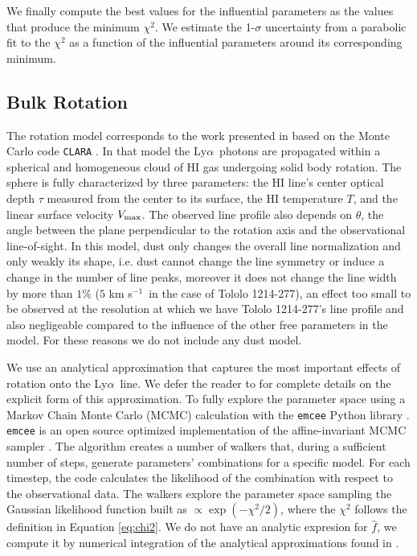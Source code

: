 \documentclass[a4,useAMS,usenatbib,usegraphicx]{mn2e}
\newcommand{\tol}{Tololo 1214-277}
\newcommand{\lya}{Ly$\alpha$}
\newcommand{\kms}{km s$^{-1}$}
\begin{document}
We finally compute the best values for the influential parameters as
the values that produce the minimum $\chi^2$.  
We estimate the 1-$\sigma$ uncertainty from a parabolic fit to the
$\chi^2$ as a function of the influential parameters around its
corresponding minimum.   




\subsection{Bulk Rotation}

The rotation model corresponds to the work presented in
\citep{GaravitoCamargo2014} based on the Monte Carlo code
\texttt{CLARA} \citep{CLARA}. 
In that model the \lya\ photons are propagated 
within a spherical and homogeneous cloud of HI gas undergoing solid
body rotation.
The sphere is fully characterized by three parameters: the HI line's
center optical  depth $\tau$ measured from the center to its surface, the HI
temperature $T$, and the linear surface velocity $V_{\rm max}$.  
The observed line profile also depends on $\theta$,  the angle between the plane
perpendicular to the rotation axis and the observational
line-of-sight.  
In this model, dust only changes the overall line
normalization and only weakly its shape, i.e. 
dust cannot change the line symmetry or induce a change in the number
of line peaks, moreover it does not change the line width by more than
$1\%$ ($5$ \kms\ in the case of \tol), an effect too small to be
observed at the resolution at which we have \tol's line profile and
also negligeable compared to the influence of the other free parameters in the model.
For these reasons we do not include any dust model. 

We use an analytical approximation that captures the most important
effects of rotation onto the \lya\ line. 
We defer the reader to \citet{GaravitoCamargo2014} for complete
details on the explicit form of this approximation.
To fully explore the
parameter space using a Markov Chain Monte Carlo (MCMC) calculation with the
\texttt{emcee} Python library \citep{2013PASP..125..306F}. \texttt{emcee} 
is an open source optimized implementation of the affine-invariant 
MCMC sampler \citep{goodman2010ensemble}. 
The algorithm creates a number of walkers that,
during a sufficient number of steps, generate parameters' combinations
for a specific model.
For each timestep, the code calculates the likelihood of the
combination with respect to the observational data.
The walkers explore the parameter space sampling the Gaussian likelihood
function built as $\propto \exp(-\chi^2/2)$, where the $\chi^2$ follows
the definition in Equation \ref{eq:chi2}. 
We do not have an analytic expresion for $\hat{f}$, we compute it
by numerical integration of the analytical approximations found in
\citet{GaravitoCamargo2014}.  
\end{document}
